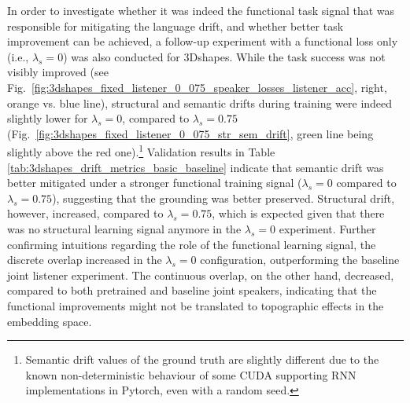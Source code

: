 In order to investigate whether it was indeed the functional task signal that was responsible for mitigating the language drift, and whether better task improvement can be achieved, a follow-up experiment with a functional loss only (i.e., $\lambda_s=0$) was also conducted for 3Dshapes. While the task success was not visibly improved (see Fig.~\ref{fig:3dshapes_fixed_listener_0_075_speaker_losses_listener_acc}, right, orange vs. blue line), structural and semantic drifts during training were indeed slightly lower for $\lambda_s=0$, compared to $\lambda_s=0.75$ (Fig.~\ref{fig:3dshapes_fixed_listener_0_075_str_sem_drift}, green line being slightly above the red one).\footnote{Semantic drift values of the ground truth are slightly different due to the known non-deterministic behaviour of some CUDA supporting RNN implementations in Pytorch, even with a random seed.} Validation results in Table \ref{tab:3dshapes_drift_metrics_basic_baseline} indicate that semantic drift was better mitigated under a stronger functional training signal ($\lambda_s =0$ compared to $\lambda_s =0.75$), suggesting that the grounding was better preserved. Structural drift, however, increased, compared to $\lambda_s =0.75$, which is expected given that there was no structural learning signal anymore in the $\lambda_s =0$ experiment. Further confirming intuitions regarding the role of the functional learning signal, the discrete overlap increased in the $\lambda_s =0$ configuration, outperforming the baseline joint listener experiment. The continuous overlap, on the other hand, decreased, compared to both pretrained and baseline joint speakers, indicating that the functional improvements might not be translated to topographic effects in the embedding space.

